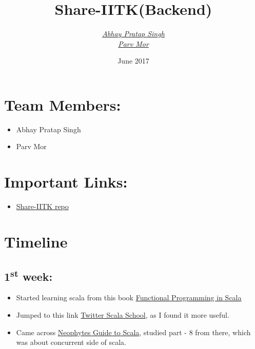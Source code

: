 \documentclass{article}
\title{Share-IITK(Backend)}
\author{\href{mailto:abhays@iitk.ac.in}{\textit{Abhay Pratap Singh}}
		\\
        \href{mailto:parv@iitk.ac.in}{\textit{Parv Mor}}}
\date{June 2017}
\begin{document}
\maketitle
\section*{Team Members:}
\begin{itemize}
	\item Abhay Pratap Singh
    \item Parv Mor
\end{itemize}
\section*{Important Links:}
\begin{itemize}
	\item \href{https://github.com/abhayptp/share-iitk}{Share-IITK repo}
\end{itemize}
\section*{\textbf{Timeline}}
\subsection*{1\textsuperscript{st} week:}
\begin{itemize}
	 \item Started learning scala from this book \href{https://www.manning.com/books/functional-programming-in-scala}{Functional Programming in Scala}
    \item Jumped to this link \href{https://twitter.github.io/scala_school/}{Twitter Scala School}, as I found it more useful.
    \item Came across \href{http://danielwestheide.com/scala/neophytes.html}{Neophytes Guide to Scala}, studied part - 8 from there, which was about concurrent side of scala.
\end{itemize}
\end{document}
